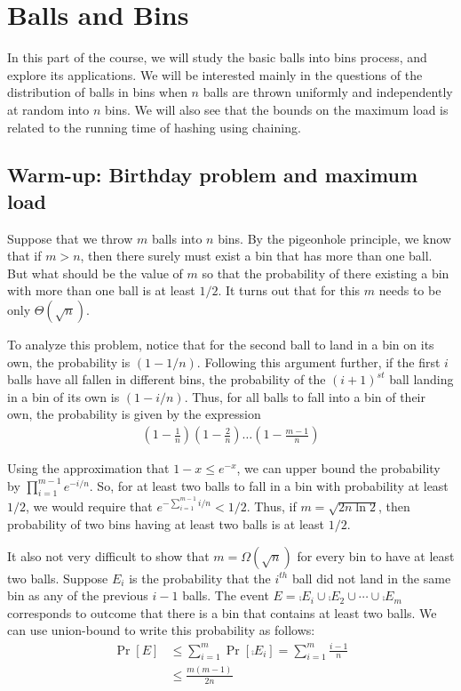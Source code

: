 \chapter{Balls and Bins}

In this part of the course, we will study the basic balls into bins process, and explore its applications. We will be interested mainly in the questions of the distribution of balls in bins when $n$ balls are thrown uniformly and independently at random into $n$ bins. We will also see that the bounds on the maximum load is related to the running time of hashing using chaining. 

\section{Warm-up: Birthday problem and maximum load}

Suppose that we throw $m$ balls into $n$ bins. By the pigeonhole principle, we know that if $m > n$, then there surely must exist a bin that has more than one ball. But what should be the value of $m$ so that the probability of there existing a bin with more than one ball is at least $1/2$. It turns out that for this $m$ needs to be only $\Theta(\sqrt{n})$. 

To analyze this problem, notice that for the second ball to land in a bin on its own, the probability is $(1 - 1/n)$. Following this argument further, if the first $i$ balls have all fallen in different bins, the probability of the $(i+1)^{st}$ ball landing in a bin of its own is $(1 - i/n)$. Thus, for all balls to fall into a bin of their own, the probability is given by the expression
\begin{align*}
	\left(1 - \frac{1}{n}\right) \left( 1 - \frac{2}{n}\right) \ldots \left(1 - \frac{m-1}{n}\right)
\end{align*}

Using the approximation that $1-x \leq e^{-x}$, we can upper bound the
probability by $\prod_{i=1}^{m-1} e^{-i/n}$. So, for at least two balls to fall
in a bin with probability at least $1/2$, we would require that
$e^{-\sum_{i=1}^{m-1} i/n} < 1/2.$ Thus, if $m = \sqrt{2n\ln 2}$, then
probability of two bins having at least two balls is at least $1/2$.

It also not very difficult to show that $m = \Omega(\sqrt{n})$ for every bin to
have at least two balls.  Suppose $E_i$ is the probability that the $i^{th}$
ball did not land in the same bin as any of the previous $i-1$ balls. The event
$E = \comp{E}_i \cup \comp{E}_2 \cup \cdots \cup \comp{E}_m$ corresponds to
outcome that there is a bin that contains at least two balls. We can use
union-bound to write this probability as follows:
\begin{align*}
  \Pr[E] &\leq \sum_{i=1}^m \Pr[\comp{E}_i] = \sum_{i=1}^m \frac{i-1}{n}\\
  &\leq \frac{m(m-1)}{2n}
\end{align*}

